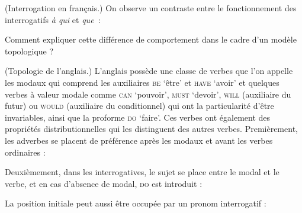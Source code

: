 {     (Interrogation en français.) On observe un contraste entre le fonctionnement des interrogatifs \textit{à qui} et \textit{que~}:
    
    \begin{exe}
    \sn
    \begin{xlista}
    \end{xlista}
    \end{exe}
    Comment expliquer cette différence de comportement dans le cadre d’un modèle topologique ?

     (Topologie de l’anglais.) L’anglais possède une classe de verbes que l’on appelle les modaux qui comprend les auxiliaires \textsc{be} ‘être’ et \textsc{have} ‘avoir’ et quelques verbes à valeur modale comme \textsc{can} ‘pouvoir’, \textsc{must} ‘devoir’, \textsc{will} (auxiliaire du futur) ou \textsc{would} (auxiliaire du conditionnel) qui ont la particularité d’être invariables, ainsi que la proforme \textsc{do} ‘faire’. Ces verbes ont également des propriétés distributionnelles qui les distinguent des autres verbes. Premièrement, les adverbes se placent de préférence après les modaux et avant les verbes ordinaires :
    
    \begin{exe}
    \begin{xlista}
    \end{xlista}
    \end{exe}

    Deuxièmement, dans les interrogatives, le sujet se place entre le modal et le verbe, et en cas d’absence de modal, \textsc{do} est introduit :
    
    \begin{exe}
    \begin{xlista}
    \end{xlista}
    \end{exe}
    La position initiale peut aussi être occupée par un pronom interrogatif :
    
}

